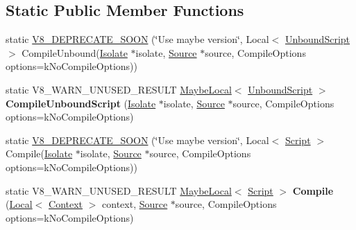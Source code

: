 \subsection*{Static Public Member Functions}
\begin{DoxyCompactItemize}
\item 
static \hyperlink{classv8_1_1ScriptCompiler_a092d08beb6c7c73e731197d0caf3abb3}{V8\+\_\+\+D\+E\+P\+R\+E\+C\+A\+T\+E\+\_\+\+S\+O\+O\+N} (\char`\"{}Use maybe version\char`\"{}, Local$<$ \hyperlink{classv8_1_1UnboundScript}{Unbound\+Script} $>$ Compile\+Unbound(\hyperlink{classv8_1_1Isolate}{Isolate} $\ast$isolate, \hyperlink{classv8_1_1ScriptCompiler_1_1Source}{Source} $\ast$source, Compile\+Options options=k\+No\+Compile\+Options))
\item 
\hypertarget{classv8_1_1ScriptCompiler_a4d3ed07e15d6ed5a5f569b44abc2cda9}{}static V8\+\_\+\+W\+A\+R\+N\+\_\+\+U\+N\+U\+S\+E\+D\+\_\+\+R\+E\+S\+U\+L\+T \hyperlink{classv8_1_1MaybeLocal}{Maybe\+Local}$<$ \hyperlink{classv8_1_1UnboundScript}{Unbound\+Script} $>$ {\bfseries Compile\+Unbound\+Script} (\hyperlink{classv8_1_1Isolate}{Isolate} $\ast$isolate, \hyperlink{classv8_1_1ScriptCompiler_1_1Source}{Source} $\ast$source, Compile\+Options options=k\+No\+Compile\+Options)\label{classv8_1_1ScriptCompiler_a4d3ed07e15d6ed5a5f569b44abc2cda9}

\item 
static \hyperlink{classv8_1_1ScriptCompiler_a43c0f68d88fd3ce1a648e1f352797319}{V8\+\_\+\+D\+E\+P\+R\+E\+C\+A\+T\+E\+\_\+\+S\+O\+O\+N} (\char`\"{}Use maybe version\char`\"{}, Local$<$ \hyperlink{classv8_1_1Script}{Script} $>$ Compile(\hyperlink{classv8_1_1Isolate}{Isolate} $\ast$isolate, \hyperlink{classv8_1_1ScriptCompiler_1_1Source}{Source} $\ast$source, Compile\+Options options=k\+No\+Compile\+Options))
\item 
\hypertarget{classv8_1_1ScriptCompiler_a5bb0c5823fe340b0ad3fdfb595cea9a4}{}static V8\+\_\+\+W\+A\+R\+N\+\_\+\+U\+N\+U\+S\+E\+D\+\_\+\+R\+E\+S\+U\+L\+T \hyperlink{classv8_1_1MaybeLocal}{Maybe\+Local}$<$ \hyperlink{classv8_1_1Script}{Script} $>$ {\bfseries Compile} (\hyperlink{classv8_1_1Local}{Local}$<$ \hyperlink{classv8_1_1Context}{Context} $>$ context, \hyperlink{classv8_1_1ScriptCompiler_1_1Source}{Source} $\ast$source, Compile\+Options options=k\+No\+Compile\+Options)\label{classv8_1_1ScriptCompiler_a5bb0c5823fe340b0ad3fdfb595cea9a4}


\end{DoxyCompactItemize}

